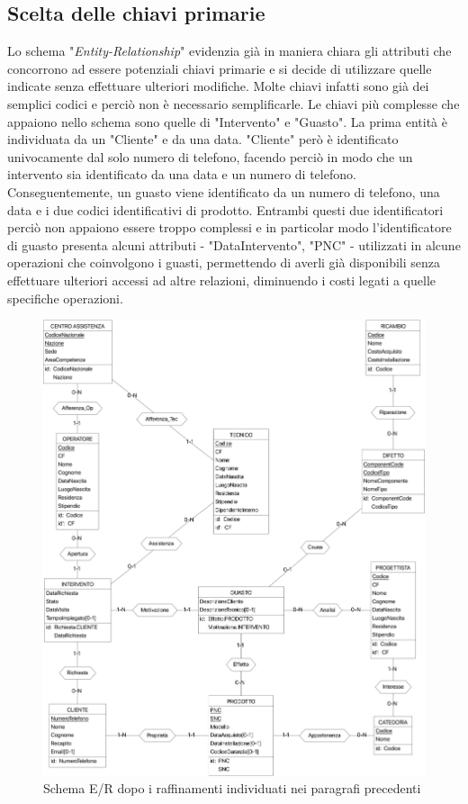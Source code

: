 \documentclass[a4paper, 12pt]{report}
\begin{document}
\subsection{Scelta delle chiavi primarie}

Lo schema "\textit{Entity-Relationship}" evidenzia già in maniera chiara gli attributi che concorrono ad essere potenziali chiavi primarie e si decide di utilizzare quelle
indicate senza effettuare ulteriori modifiche. Molte chiavi infatti sono già dei semplici codici e perciò non è necessario semplificarle. Le chiavi più complesse che appaiono nello
schema sono quelle di "Intervento" e "Guasto". La prima entità è individuata da un "Cliente" e da una data. "Cliente" però è identificato univocamente dal solo numero di telefono,
facendo perciò in modo che un intervento sia identificato da una data e un numero di telefono. Conseguentemente, un guasto viene identificato da un numero di telefono, una data e i
due codici identificativi di prodotto. Entrambi questi due identificatori perciò non appaiono essere troppo complessi e in particolar modo l'identificatore di guasto presenta alcuni
attributi - "DataIntervento", "PNC" - utilizzati in alcune operazioni che coinvolgono i guasti, permettendo di averli già disponibili senza effettuare ulteriori accessi ad altre relazioni,
diminuendo i costi legati a quelle specifiche operazioni.

\begin{figure}[H]
	\centering
	\includegraphics[width=\linewidth]{images/refined.png}
	\caption{Schema E/R dopo i raffinamenti individuati nei paragrafi precedenti}
\end{figure}
\end{document}
